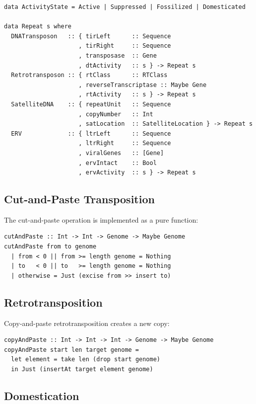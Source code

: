 \documentclass[12pt,a4paper]{article}
\begin{document}
\begin{verbatim}
data ActivityState = Active | Suppressed | Fossilized | Domesticated

data Repeat s where
  DNATransposon   :: { tirLeft      :: Sequence
                     , tirRight     :: Sequence
                     , transposase  :: Gene
                     , dtActivity   :: s } -> Repeat s
  Retrotransposon :: { rtClass      :: RTClass
                     , reverseTranscriptase :: Maybe Gene
                     , rtActivity   :: s } -> Repeat s
  SatelliteDNA    :: { repeatUnit   :: Sequence
                     , copyNumber   :: Int
                     , satLocation  :: SatelliteLocation } -> Repeat s
  ERV             :: { ltrLeft      :: Sequence
                     , ltrRight     :: Sequence
                     , viralGenes   :: [Gene]
                     , ervIntact    :: Bool
                     , ervActivity  :: s } -> Repeat s
\end{verbatim}

\subsection{Cut-and-Paste Transposition}

The cut-and-paste operation is implemented as a pure function:

\begin{verbatim}
cutAndPaste :: Int -> Int -> Genome -> Maybe Genome
cutAndPaste from to genome
  | from < 0 || from >= length genome = Nothing
  | to   < 0 || to   >= length genome = Nothing
  | otherwise = Just (excise from >> insert to)
\end{verbatim}

\subsection{Retrotransposition}

Copy-and-paste retrotransposition creates a new copy:

\begin{verbatim}
copyAndPaste :: Int -> Int -> Int -> Genome -> Maybe Genome
copyAndPaste start len target genome =
  let element = take len (drop start genome)
  in Just (insertAt target element genome)
\end{verbatim}

\subsection{Domestication}
\end{document}
